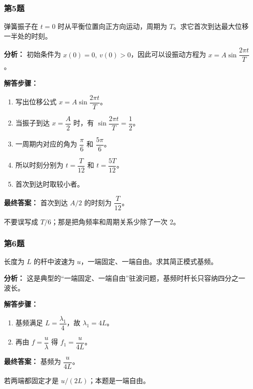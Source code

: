 \documentclass[12pt,a4paper]{ctexart}
\begin{document}
\subsubsection*{第5题}
\begin{tcolorbox}[colback=gray!2!white,colframe=black!60,title={题目}]
弹簧振子在 \(t=0\) 时从平衡位置向正方向运动，周期为 \(T\)。求它首次到达最大位移一半处的时刻。\par
\end{tcolorbox}
\begin{tcolorbox}[colback=blue!2!white,colframe=blue!55!black,title={完整答案}]
\textbf{分析：}
初始条件为 \(x(0)=0,\ v(0)>0\)，因此可以设振动方程为 \(x=A\sin\dfrac{2\pi t}{T}\)。\par
\textbf{解答步骤：}
\begin{enumerate}
\item 写出位移公式 \(x=A\sin\dfrac{2\pi t}{T}\)。
\item 当振子到达 \(x=\dfrac{A}{2}\) 时，有 \(\sin\dfrac{2\pi t}{T}=\dfrac12\)。
\item 一周期内对应的角为 \(\dfrac{\pi}{6}\) 和 \(\dfrac{5\pi}{6}\)。
\item 所以时刻分别为 \(t=\dfrac{T}{12}\) 和 \(t=\dfrac{5T}{12}\)。
\item 首次到达时取较小者。
\end{enumerate}
\textbf{最终答案：}
首次到达 \(A/2\) 的时刻为 \(\dfrac{T}{12}\)。\par
\end{tcolorbox}
\begin{tcolorbox}[colback=red!2!white,colframe=red!55!black,title={易错点}]
不要误写成 \(T/6\)；那是把角频率和周期关系少除了一次 2。\par
\end{tcolorbox}

\subsubsection*{第6题}
\begin{tcolorbox}[colback=gray!2!white,colframe=black!60,title={题目}]
长度为 \(L\) 的杆中波速为 \(u\)，一端固定、一端自由。求其简正模式基频。\par
\end{tcolorbox}
\begin{tcolorbox}[colback=blue!2!white,colframe=blue!55!black,title={完整答案}]
\textbf{分析：}
这是典型的“一端固定、一端自由”驻波问题，基频时杆长只容纳四分之一波长。\par
\textbf{解答步骤：}
\begin{enumerate}
\item 基频满足 \(L=\dfrac{\lambda_1}{4}\)，故 \(\lambda_1=4L\)。
\item 再由 \(f=\dfrac{u}{\lambda}\) 得 \(f_1=\dfrac{u}{4L}\)。
\end{enumerate}
\textbf{最终答案：}
基频为 \(\dfrac{u}{4L}\)。\par
\end{tcolorbox}
\begin{tcolorbox}[colback=red!2!white,colframe=red!55!black,title={易错点}]
若两端都固定才是 \(u/(2L)\)；本题是一端自由。\par
\end{tcolorbox}
\end{document}
